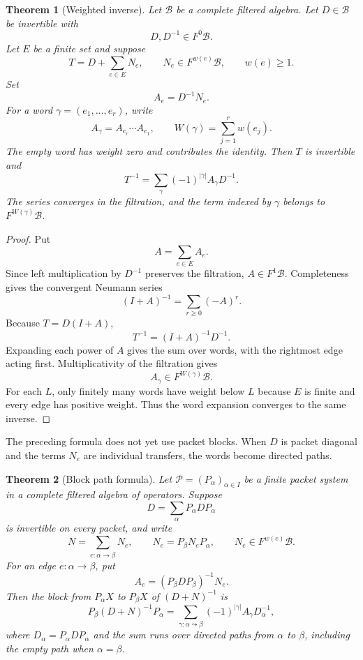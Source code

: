 \documentclass{aomart}
\newtheorem{theorem}{Theorem}[section]
\theoremstyle{definition}
\theoremstyle{remark}
\newcommand{\Bcal}{\mathcal B}
\newcommand{\Pcal}{\mathcal P}
\begin{document}
\begin{theorem}[Weighted inverse]\label{thm:weighted_inverse}
Let $\Bcal$ be a complete filtered algebra.  Let $D\in\Bcal$ be invertible with
\[
D,D^{-1}\in F^0\Bcal.
\]
Let $E$ be a finite set and suppose
\[
T=D+\sum_{e\in E}N_e,
\qquad
N_e\in F^{w(e)}\Bcal,
\qquad
w(e)\geq1.
\]
Set
\[
A_e=D^{-1}N_e.
\]
For a word $\gamma=(e_1,\ldots,e_r)$, write
\[
A_\gamma=A_{e_r}\cdots A_{e_1},
\qquad
W(\gamma)=\sum_{j=1}^rw(e_j).
\]
The empty word has weight zero and contributes the identity.  Then $T$ is invertible and
\[
T^{-1}
=
\sum_\gamma(-1)^{|\gamma|}A_\gamma D^{-1}.
\]
The series converges in the filtration, and the term indexed by $\gamma$ belongs to $F^{W(\gamma)}\Bcal$.
\end{theorem}

\begin{proof}
Put
\[
A=\sum_{e\in E}A_e.
\]
Since left multiplication by $D^{-1}$ preserves the filtration, $A\in F^1\Bcal$.  Completeness gives the convergent Neumann series
\[
(I+A)^{-1}=\sum_{r\geq0}(-A)^r.
\]
Because $T=D(I+A)$,
\[
T^{-1}=(I+A)^{-1}D^{-1}.
\]
Expanding each power of $A$ gives the sum over words, with the rightmost edge acting first.  Multiplicativity of the filtration gives
\[
A_\gamma\in F^{W(\gamma)}\Bcal.
\]
For each $L$, only finitely many words have weight below $L$ because $E$ is finite and every edge has positive weight.  Thus the word expansion converges to the same inverse.
\end{proof}

The preceding formula does not yet use packet blocks.  When $D$ is packet diagonal and the terms $N_e$ are individual transfers, the words become directed paths.

\begin{theorem}[Block path formula]\label{thm:block_path_formula}
Let $\Pcal=(P_\alpha)_{\alpha\in I}$ be a finite packet system in a complete filtered algebra of operators.  Suppose
\[
D=\sum_\alpha P_\alpha D P_\alpha
\]
is invertible on every packet, and write
\[
N=\sum_{e:\alpha\to\beta}N_e,
\qquad
N_e=P_\beta N_eP_\alpha,
\qquad
N_e\in F^{w(e)}\Bcal.
\]
For an edge $e:\alpha\to\beta$, put
\[
A_e=(P_\beta DP_\beta)^{-1}N_e.
\]
Then the block from $P_\alpha X$ to $P_\beta X$ of $(D+N)^{-1}$ is
\[
P_\beta(D+N)^{-1}P_\alpha
=
\sum_{\gamma:\alpha\leadsto\beta}
(-1)^{|\gamma|}A_\gamma D_\alpha^{-1},
\]
where $D_\alpha=P_\alpha DP_\alpha$ and the sum runs over directed paths from $\alpha$ to $\beta$, including the empty path when $\alpha=\beta$.
\end{theorem}
\end{document}
